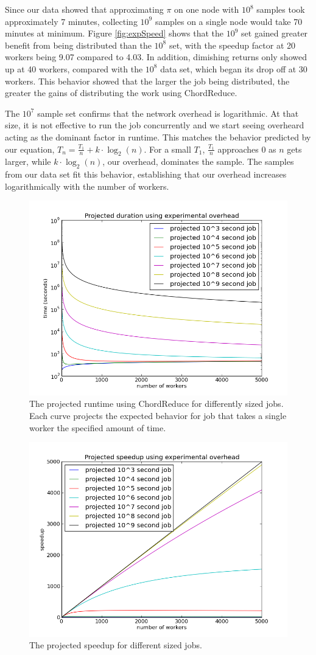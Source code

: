 Since our data showed that approximating $\pi$ on one node with $10^{8}$ samples took approximately 7 minutes, collecting $10^{9}$ samples on a single node would take 70 minutes at minimum.  
Figure \ref{fig:expSpeed} shows that the $10^{9}$ set gained greater benefit from being distributed than the $10^{8}$ set, with the speedup factor at 20 workers being 9.07 compared to 4.03.  
In addition, dimishing returns only showed up at 40 workers, compared with the $10^{8}$ data set, which began its drop off at 30 workers.
This behavior showed that the larger the job being distributed, the greater the gains of distributing the work using ChordReduce.

The $10^{7}$ sample set confirms that the network overhead is logarithmic.  
At that size, it is not effective to run the job concurrently and we start seeing overheard acting as the dominant factor in runtime.  
This matches the behavior predicted by our equation, $T_{n} = \frac{T_{1}}{n} + k \cdot \log_{2}(n)$. 
For a small $T_{1}$, $\frac{T_{1}}{n}$  approaches 0 as $n$ gets larger, while $k \cdot \log_{2}(n)$, our overhead, dominates the sample.  
The samples from our data set fit this behavior, establishing that our overhead increases logarithmically with the number of workers.


\begin{figure}
	\centering
	\includegraphics[width=0.5\linewidth]{figs/projTime}
	\caption{The projected runtime using ChordReduce for differently sized jobs.  Each curve projects the expected behavior for job that takes a single worker the specified amount of time.}
	\label{fig:projTime}
\end{figure}

\begin{figure}
	\centering
	\includegraphics[width=0.5\linewidth]{figs/projSpeed}
	\caption{The projected speedup for different sized jobs. }
	\label{fig:projSpeed}
\end{figure}

